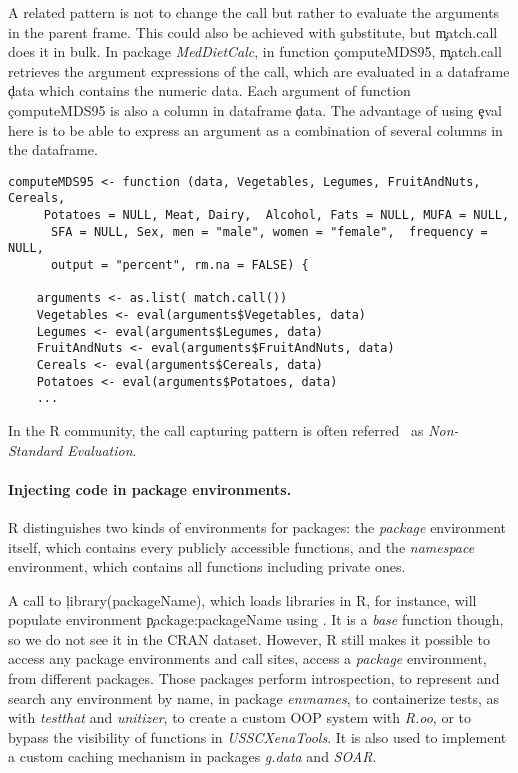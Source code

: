 \documentclass[review,nonacm,screen,acmsmall,anonymous=true]{acmart}
\begin{document}
A related pattern is not to change the call but rather to evaluate the arguments in the parent frame. This could also be achieved with \c{substitute}, but \c{match.call} does it in bulk.
In package \emph{MedDietCalc},  in function \c{computeMDS95}, \c{match.call} retrieves the argument expressions of the call, which are evaluated in a dataframe \c{data} which contains the numeric data. Each argument of function \c{computeMDS95} is also a column in dataframe \c{data}. The advantage of using \c{eval} here is to be able to express an argument as a combination of several columns in the dataframe.
\begin{lstlisting}
computeMDS95 <- function (data, Vegetables, Legumes, FruitAndNuts, Cereals,
	 Potatoes = NULL, Meat, Dairy, 	Alcohol, Fats = NULL, MUFA = NULL,
	  SFA = NULL, Sex, men = "male", women = "female", 	frequency = NULL,
	  output = "percent", rm.na = FALSE) {
	  	
	arguments <- as.list( match.call())
	Vegetables <- eval(arguments$Vegetables, data)
	Legumes <- eval(arguments$Legumes, data)
	FruitAndNuts <- eval(arguments$FruitAndNuts, data)
	Cereals <- eval(arguments$Cereals, data)
	Potatoes <- eval(arguments$Potatoes, data)
	...
\end{lstlisting}


In the R community, the call capturing pattern is often referred~\cite{hadley} as \emph{Non-Standard Evaluation}.

\paragraph{Injecting code in package environments.} R distinguishes two kinds of environments for packages: the \emph{package} environment itself, which contains every publicly accessible functions, and the \emph{namespace} environment, which contains all functions including private ones.

 A call to \c{library(packageName)}, which loads libraries in R, for instance, will
populate environment \c{package:packageName} using \eval. It is a \emph{base} function
though, so we do not see it in the CRAN dataset. However, R still makes it
possible to access any package environments and \packageNbPackageEnvSites call
sites, \ie \packagePackageEnvSitePercent access a \emph{package} environment, from
\packageNbPackageEnvPackages different packages. Those packages perform
introspection, to represent and search any environment by name, in package
\emph{envnames}, to containerize tests, as with \emph{testthat} and
\emph{unitizer}, to create a custom OOP system with \emph{R.oo}, or to bypass the visibility of functions in \emph{USSCXenaTools}. It is also used to
implement a custom caching mechanism in packages \emph{g.data} and \emph{SOAR}.
\end{document}
